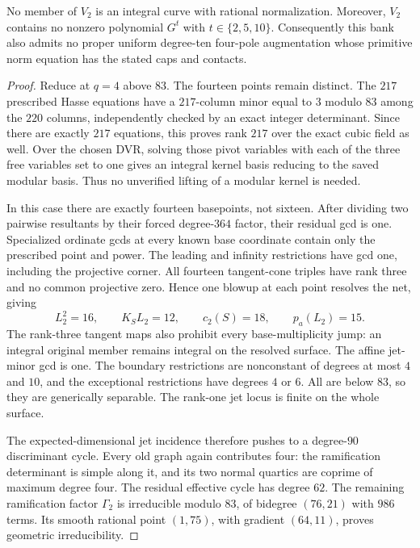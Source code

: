 \begin{theorem}
\label{thm:orbit-two-net-no-rational}
No member of $V_2$ is an integral curve with rational normalization.
Moreover, $V_2$ contains no nonzero polynomial $G^t$ with
$t\in\{2,5,10\}$. Consequently this bank also admits no proper uniform
degree-ten four-pole augmentation whose primitive norm equation has the
stated caps and contacts.
\end{theorem}

\begin{proof}
Reduce at $q=4$ above $83$. The fourteen points remain distinct. The
$217$ prescribed Hasse equations have a $217$-column minor equal to
$3$ modulo $83$ among the $220$ columns, independently checked by an
exact integer determinant. Since there are exactly $217$ equations, this proves
rank $217$ over the exact cubic field as well. Over the chosen DVR,
solving those pivot variables with each of the three free variables
set to one gives an integral kernel basis reducing to the saved modular
basis. Thus no unverified lifting of a modular kernel is needed.

In this case there are exactly fourteen basepoints, not sixteen.
After dividing two pairwise resultants by their forced degree-$364$
factor, their residual gcd is one. Specialized ordinate gcds at every
known base coordinate contain only the prescribed point and power.
The leading and infinity restrictions have gcd one, including the
projective corner. All fourteen tangent-cone triples have rank three
and no common projective zero. Hence one blowup at each point resolves
the net, giving
\[
 L_2^2=16,\qquad K_SL_2=12,\qquad c_2(S)=18,
 \qquad p_a(L_2)=15.
\]
The rank-three tangent maps also prohibit every base-multiplicity jump:
an integral original member remains integral on the resolved surface.
The affine jet-minor gcd is one. The boundary restrictions are
nonconstant of degrees at most $4$ and $10$, and the exceptional
restrictions have degrees $4$ or $6$. All are below $83$, so they are
generically separable. The rank-one jet locus is finite on the whole
surface.

The expected-dimensional jet incidence therefore pushes to a degree-$90$
discriminant cycle. Every old graph again contributes four: the
ramification determinant is simple along it, and its two normal quartics
are coprime of maximum degree four. The residual effective cycle has
degree $62$. The remaining ramification factor $\Gamma_2$ is irreducible
modulo $83$, of bidegree $(76,21)$ with $986$ terms. Its smooth rational
point $(1,75)$, with gradient $(64,11)$, proves geometric irreducibility.


\end{proof}
